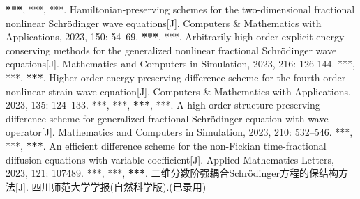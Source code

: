    \begin{mypaper}
      \begin{thebibliography}{99}  
       \textbf{***}, ***, ***. Hamiltonian-preserving schemes for the two-dimensional fractional nonlinear Schrödinger wave equations[J]. Computers \& Mathematics with Applications, 2023, 150: 54–69.
       \textbf{***}, ***. Arbitrarily high-order explicit energy-conserving methods for the generalized nonlinear fractional Schrödinger wave equations[J]. Mathematics and Computers in Simulation, 2023, 216: 126-144.
       ***, ***, \textbf{***}. Higher-order energy-preserving difference scheme for the fourth-order nonlinear strain wave equation[J]. Computers \& Mathematics with Applications, 2023, 135: 124–133.
       ***, ***, \textbf{***}, ***. A high-order structure-preserving difference scheme for generalized fractional Schrödinger equation with wave operator[J]. Mathematics and Computers in Simulation, 2023, 210: 532–546.
       ***, ***, \textbf{***}. An efficient difference scheme for the non-Fickian time-fractional diffusion equations with variable coefficient[J]. Applied Mathematics Letters, 2023, 121: 107489.
       ***, ***, \textbf{***}. 二维分数阶强耦合Schr{\"o}dinger方程的保结构方法[J]. 四川师范大学学报(自然科学版).(已录用)
      \end{thebibliography}
   \end{mypaper}
   